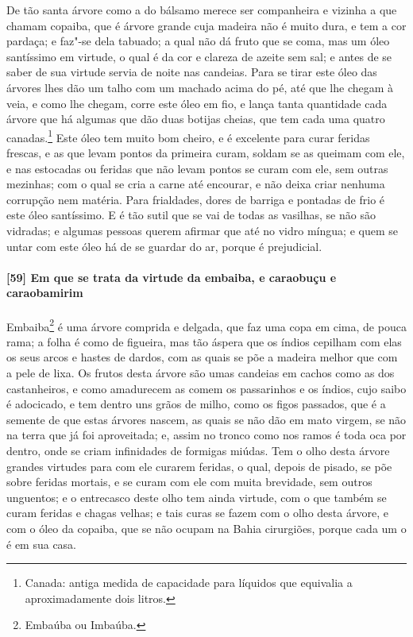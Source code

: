 \begin{linenumbers}
De tão santa árvore como a do bálsamo merece ser companheira e vizinha a que chamam
copaiba, que é árvore grande cuja madeira não é muito dura, e tem a cor pardaça; e faz"-se
dela tabuado; a qual não dá fruto que se coma, mas um óleo
santíssimo em virtude, o qual é da cor e clareza de azeite sem sal; e antes de se saber de
sua virtude servia de 
noite nas candeias. Para se tirar este óleo das árvores lhes dão um talho com um machado
acima do pé, até que lhe chegam à veia, e como lhe chegam, corre este óleo em fio, e lança
tanta quantidade cada árvore que há algumas que dão duas botijas cheias, que tem cada uma
quatro canadas.\footnote{ Canada: antiga medida de capacidade para líquidos que equivalia
a aproximadamente dois litros.} Este óleo tem muito bom cheiro, e é excelente para curar
feridas frescas, e as que levam pontos da primeira curam, soldam se as queimam com ele, e
nas estocadas ou feridas que não levam pontos se curam com ele, sem outras mezinhas; com o
qual se cria a carne até encourar, e não deixa criar nenhuma corrupção nem matéria. Para
frialdades, dores de barriga e pontadas de frio é este óleo santíssimo. E é tão sutil que
se vai de todas as vasilhas, se não são vidradas; e algumas pessoas querem afirmar que até
no vidro míngua; e quem se untar com este óleo há de se guardar do ar, porque é
prejudicial.

\paragraph{[59] Em que se trata da virtude da embaiba, e caraobuçu e caraobamirim}\quad
Embaiba\footnote{ Embaúba ou Imbaúba.} é uma árvore comprida e delgada, que faz uma copa
em cima, de pouca rama; a folha é como de figueira, mas tão áspera que os índios cepilham
com elas os seus arcos e hastes de dardos, com as quais se põe a madeira melhor que com a
pele de lixa. Os frutos desta árvore são umas candeias em cachos como as dos castanheiros,
e como amadurecem as comem os passarinhos e os índios, cujo saibo é adocicado, e tem
dentro uns grãos de milho, como os figos passados, que é a semente de que estas árvores
nascem, as quais se não dão em mato virgem, se não na terra que já foi aproveitada; e,
assim no tronco como nos ramos é toda oca por dentro, onde se criam infinidades de
formigas miúdas. Tem o olho desta árvore grandes virtudes para com ele curarem feridas, o
qual, depois de pisado, se põe sobre feridas mortais, e se curam com ele com muita
brevidade, sem outros unguentos; e o entrecasco deste olho tem ainda virtude, com o que
também se curam feridas e chagas velhas; e tais curas se fazem com o olho desta árvore, e
com o óleo da copaiba, que se não ocupam na Bahia cirurgiões, porque cada um o é em sua
casa.


\end{linenumbers}
